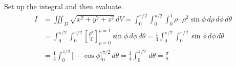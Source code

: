 \documentclass[a4paper, 12pt]{article}
\begin{document}
\begin{enumerate}[leftmargin=*,label=\textbf{\arabic*.}]
Set up the integral and then evaluate.
\begin{align*}
I&=\iiint_D\sqrt{x^2+y^2+z^2}\,dV=\int_0^{\pi/2}\int_0^{\pi/2}\int_0^1\rho\cdot\rho^2\sin\phi\,d\rho\,d\phi\,d\theta\\[1em]&=\int_0^{\pi/2}\int_0^{\pi/2}\left[\frac{\rho^4}4\right]_{\rho=0}^{\rho=1}\sin\phi\,d\phi\,d\theta=\frac14\int_0^{\pi/2}\int_0^{\pi/2}\sin\phi\,d\phi\,d\theta\\[1em]&=\frac14\int_0^{\pi/2}\bigg[-\cos\phi\bigg]_0^{\pi/2}\,d\theta=\frac14\int_0^{\pi/2}\,d\theta=\boxed{\frac\pi8}
\end{align*}

\end{enumerate}
\end{document}
